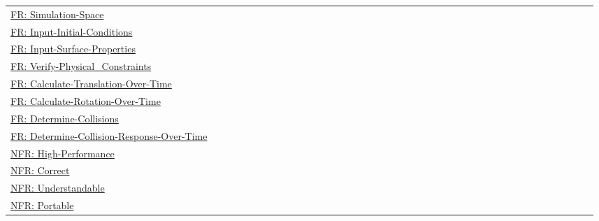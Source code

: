 \documentclass[12pt]{article}
\begin{document}
\begin{longtable}{l l l l l l l l l l l l l l l l l l l l l l l l l l l l l l l l l l l l l l l l}
\\
\hyperref[simSpace]{FR: Simulation-Space} &  &  &  &  &  &  &  &  &  &  &  &  &  &  &  &  &  &  &  &  &  &  &  &  &  &  &  &  &  &  &  &  &  &  &  &  &  &  & 
\\
\hyperref[inputInitialConds]{FR: Input-Initial-Conditions} &  &  &  &  &  &  &  &  &  &  &  &  &  &  &  &  &  &  &  &  &  &  &  &  &  &  &  &  &  &  &  &  &  &  &  &  &  &  & 
\\
\hyperref[inputSurfaceProps]{FR: Input-Surface-Properties} &  &  &  &  &  &  &  &  &  &  &  &  &  &  &  &  &  &  &  &  &  &  &  &  &  &  &  &  &  &  &  &  &  &  &  &  &  &  & 
\\
\hyperref[verifyPhysCons]{FR: Verify-Physical\_Constraints} &  &  &  &  &  &  &  &  &  &  &  &  &  &  &  &  &  &  &  &  &  &  &  &  &  &  &  &  &  &  &  &  &  &  &  &  &  &  & 
\\
\hyperref[calcTransOverTime]{FR: Calculate-Translation-Over-Time} &  &  &  &  &  &  &  &  &  &  &  &  &  &  &  &  &  &  &  &  &  &  &  &  &  &  &  &  &  &  &  &  &  &  &  &  &  &  & 
\\
\hyperref[calcRotOverTime]{FR: Calculate-Rotation-Over-Time} &  &  &  &  &  &  &  &  &  &  &  &  &  &  &  &  &  &  &  &  &  &  &  &  &  &  &  &  &  &  &  &  &  &  &  &  &  &  & 
\\
\hyperref[deterColls]{FR: Determine-Collisions} &  &  &  &  &  &  &  &  &  &  &  &  &  &  &  &  &  &  &  &  &  &  &  &  &  &  &  &  &  &  &  &  &  &  &  &  &  &  & 
\\
\hyperref[deterCollRespOverTime]{FR: Determine-Collision-Response-Over-Time} &  &  &  &  &  &  &  &  &  &  &  &  &  &  &  &  &  &  &  &  &  &  &  &  &  &  &  &  &  &  &  &  &  &  &  &  &  &  & 
\\
\hyperref[highPerformance]{NFR: High-Performance} &  &  &  &  &  &  &  &  &  &  &  &  &  &  &  &  &  &  &  &  &  &  &  &  &  &  &  &  &  &  &  &  &  &  &  &  &  &  & 
\\
\hyperref[correct]{NFR: Correct} &  &  &  &  &  &  &  &  &  &  &  &  &  &  &  &  &  &  &  &  &  &  &  &  &  &  &  &  &  &  &  &  &  &  &  &  &  &  & 
\\
\hyperref[understandable]{NFR: Understandable} &  &  &  &  &  &  &  &  &  &  &  &  &  &  &  &  &  &  &  &  &  &  &  &  &  &  &  &  &  &  &  &  &  &  &  &  &  &  & 
\\
\hyperref[portable]{NFR: Portable} &  &  &  &  &  &  &  &  &  &  &  &  &  &  &  &  &  &  &  &  &  &  &  &  &  &  &  &  &  &  &  &  &  &  &  &  &  &  & 
\\

\end{longtable}
\end{document}
